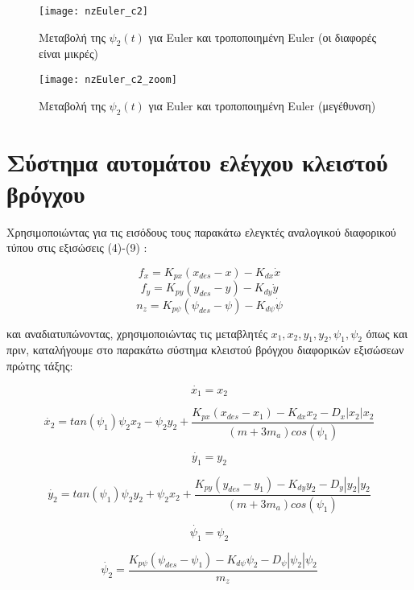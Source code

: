 \documentclass{article}
\begin{document}
\clearpage
\begin{figure}[h!]
\texttt{[image: nzEuler\_c2]}
\caption{Μεταβολή της $\psi_2(t)$ για Euler και τροποποιημένη Euler (οι διαφορές είναι μικρές)}
\end{figure}

\begin{figure}[h!]
\texttt{[image: nzEuler\_c2\_zoom]}
\caption{Μεταβολή της $\psi_2(t)$ για Euler και τροποποιημένη Euler (μεγέθυνση)}
\label{l_12}
\end{figure}
\clearpage

\section{Σύστημα αυτομάτου ελέγχου κλειστού βρόγχου}
Χρησιμοποιώντας για τις εισόδους τους παρακάτω ελεγκτές αναλογικού διαφορικού τύπου στις εξισώσεις (4)-(9) :

\[f_x = K_{px}(x_{des} - x) - K_{dx}\dot{x} \]
\[f_y = K_{py}(y_{des} - y) - K_{dy}\dot{y} \]
\[n_z = K_{p\psi}(\psi_{des} - \psi) - K_{d\psi}\dot{\psi} \]

και αναδιατυπώνοντας, χρησιμοποιώντας τις μεταβλητές \(x_1, x_2, y_1, y_2, \psi_1, \psi_2\) όπως και πριν, καταλήγουμε στο παρακάτω σύστημα κλειστού βρόγχου διαφορικών εξισώσεων πρώτης τάξης:



\begin{equation}
\dot{x_1} = x_2
\end{equation}

\begin{equation}
\dot{x_2} = tan(\psi_1)\psi_2x_2 - \psi_2y_2 + \frac{K_{px}(x_{des} - x_1) - K_{dx}x_2 - D_x|x_2|x_2}{(m + 3m_a)cos(\psi_1)} 
\end{equation}

\begin{equation}
\dot{y_1} = y_2
\end{equation}

\begin{equation}
\dot{y_2} = tan(\psi_1)\psi_2y_2 + \psi_2x_2 + \frac{K_{py}(y_{des} - y_1) - K_{dy}y_2 - D_y|y_2|y_2}{(m + 3m_a)cos(\psi_1)} 
\end{equation}

\begin{equation}
\dot{\psi_1} = \psi_2
\end{equation}

\begin{equation}
\dot{\psi_2} = \frac{K_{p\psi}(\psi_{des} - \psi_1) - K_{d\psi}\psi_2  - D_\psi|\psi_2|\psi_2}{m_z} 
\end{equation}
\end{document}
